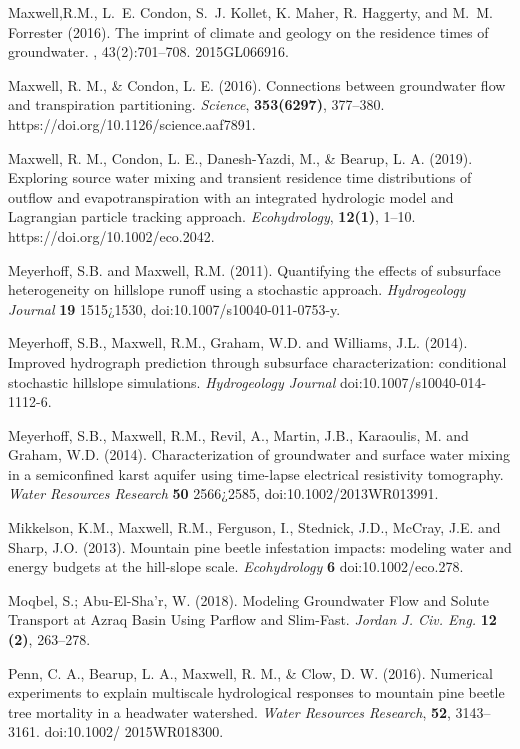 \begin{thebibliography}{999}
Maxwell,R.M., L.~E. Condon, S.~J. Kollet, K. Maher, R. Haggerty, and
M.~M. Forrester (2016).
\newblock The imprint of climate and geology on the residence times of
  groundwater.
, 43(2):701--708.
\newblock 2015GL066916.


Maxwell, R. M., \& Condon, L. E. (2016). Connections between groundwater flow and transpiration partitioning. {\em Science}, {\bf 353(6297)}, 377–380. https://doi.org/10.1126/science.aaf7891.


Maxwell, R. M., Condon, L. E., Danesh-Yazdi, M., \& Bearup, L. A. (2019). Exploring source water mixing and transient residence time distributions of outflow and evapotranspiration with an integrated hydrologic model and Lagrangian particle tracking approach. {\em Ecohydrology}, {\bf 12(1)}, 1–10. https://doi.org/10.1002/eco.2042.


Meyerhoff, S.B. and Maxwell, R.M. (2011). Quantifying the effects of subsurface heterogeneity on hillslope runoff using a stochastic approach. {\em Hydrogeology Journal} {\bf 19} 1515¿1530, doi:10.1007/s10040-011-0753-y.

Meyerhoff, S.B., Maxwell, R.M., Graham, W.D. and Williams, J.L. (2014). Improved hydrograph prediction through subsurface characterization: conditional stochastic hillslope simulations. {\em Hydrogeology Journal} doi:10.1007/s10040-014-1112-6.

Meyerhoff, S.B., Maxwell, R.M., Revil, A., Martin, J.B., Karaoulis, M. and Graham, W.D. (2014). Characterization of groundwater and surface water mixing in a semiconfined karst aquifer using time-lapse electrical resistivity tomography. {\em Water Resources Research} {\bf 50} 2566¿2585, doi:10.1002/2013WR013991.

Mikkelson, K.M., Maxwell, R.M., Ferguson, I., Stednick, J.D., McCray, J.E. and Sharp, J.O. (2013). Mountain pine beetle infestation impacts: modeling water and energy budgets at the hill-slope scale. {\em Ecohydrology} {\bf 6} doi:10.1002/eco.278.

Moqbel, S.; Abu-El-Sha’r, W. (2018). Modeling Groundwater Flow and Solute Transport at Azraq Basin Using Parflow and Slim-Fast. {\em Jordan J. Civ. Eng.} {\bf 12 (2)}, 263–278.

Penn, C. A., Bearup, L. A., Maxwell, R. M., \& Clow, D. W. (2016). Numerical experiments to explain multiscale hydrological responses to mountain pine beetle tree mortality in a headwater watershed. {\em Water Resources Research}, {\bf 52}, 3143–3161. doi:10.1002/ 2015WR018300.



\end{thebibliography}
